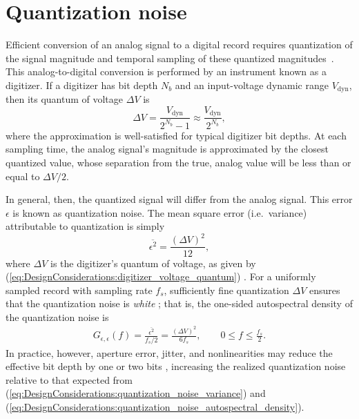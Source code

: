 \section{Quantization noise}
\label{sec:DesignConsiderations:quantization}
Efficient conversion of an analog signal to a digital record requires
quantization of the signal magnitude and
temporal sampling of these quantized magnitudes~\cite{bennett_bstj48}.
This analog-to-digital conversion
is performed by an instrument known as a digitizer.
If a digitizer has bit depth $N_b$ and
an input-voltage dynamic range $V_{\text{dyn}}$,
then its quantum of voltage $\Delta V$ is
\begin{equation}
  \Delta V
  =
  \frac{V_{\text{dyn}}}{2^{N_b} - 1}
  \approx
  \frac{V_{\text{dyn}}}{2^{N_b}},
  \label{eq:DesignConsiderations:digitizer_voltage_quantum}
\end{equation}
where the approximation is well-satisfied
for typical digitizer bit depths.
At each sampling time,
the analog signal's magnitude is approximated
by the closest quantized value, whose
separation from the true, analog value
will be less than or equal to $\Delta V / 2$.

In general, then, the quantized signal
will differ from the analog signal.
This error $\epsilon$ is known as quantization noise.
The mean square error (i.e.\ variance) attributable to quantization is simply
\begin{equation}
  \overline{\epsilon^2} = \frac{(\Delta V)^2}{12},
  \label{eq:DesignConsiderations:quantization_noise_variance}
\end{equation}
where $\Delta V$ is the digitizer's quantum of voltage,
as given by (\ref{eq:DesignConsiderations:digitizer_voltage_quantum})
\cite{bennett_bstj48}
\cite[Sec.~10.2.4]{bendat_and_piersol}.
For a uniformly sampled record with sampling rate $f_s$,
sufficiently fine quantization $\Delta V$
ensures that the quantization noise is \emph{white}
\cite[Th.~1]{bennett_bstj48}
\cite[Ch.~20]{widrow_and_kollar};
that is, the one-sided autospectral density of the quantization noise is
\begin{align}
  G_{\epsilon,\epsilon}(f)
  =
  \frac{\overline{\epsilon^2}}{f_s / 2}
  =
  \frac{(\Delta V)^2}{6 f_s},
  \qquad
  0 \leq f \leq \frac{f_s}{2}.
  \label{eq:DesignConsiderations:quantization_noise_autospectral_density}
\end{align}
In practice, however, aperture error, jitter, and nonlinearities
may reduce the effective bit depth by one or two bits
\cite[Sec.~10.2.4]{bendat_and_piersol},
increasing the realized quantization noise
relative to that expected from
(\ref{eq:DesignConsiderations:quantization_noise_variance}) and
(\ref{eq:DesignConsiderations:quantization_noise_autospectral_density}).

